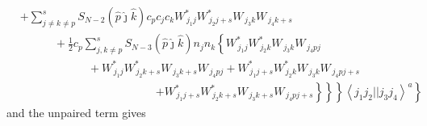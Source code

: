 \documentclass[aps,preprint]{revtex4}%
\begin{document}
\begin{align*}
&  +\sum_{j\neq k\neq p}^{s}S_{N-2}\left(  \hat{p}\hat{\jmath}\hat{k}\right)
c_{p}c_{j}c_{k}W_{\,j_{1}j}^{\ast}W_{\,j_{2}j+s}^{\ast}W_{\,j_{3}k}%
W_{\,j_{4}k+s}\qquad\qquad\qquad\\
&  \qquad\quad+\frac{1}{2}c_{p}\sum_{j,k\neq p}^{s}S_{N-3}\left(  \hat{p}%
\hat{\jmath}\hat{k}\right)  n_{j}n_{k}\left\{  W_{\,j_{1}j}^{\ast}W_{\,j_{2}%
k}^{\ast}W_{\,j_{3}k}W_{\,j_{4}pj}\right.  \\
&  \qquad\qquad\qquad+W_{\,j_{1}j}^{\ast}W_{\,j_{2}k+s}^{\ast}W_{\,j_{3}%
k+s}W_{\,j_{4}pj}+W_{\,j_{1}j+s}^{\ast}W_{\,j_{2}k}^{\ast}W_{\,j_{3}%
k}W_{\,j_{4}pj+s}\\
&  \qquad\qquad\qquad\qquad\qquad\qquad\left.  \left.  \left.  \left.
+W_{\,j_{1}j+s}^{\ast}W_{\,j_{2}k+s}^{\ast}W_{\,j_{3}k+s}W_{\,j_{4}%
pj+s}\right\}  \underset{}{\overset{}{}}\right\}  \right\}  \left\langle
j_{1}j_{2}||j_{3}j_{4}\right\rangle ^{a}\underset{}{\overset{\underset
{}{\overset{}{}}}{}}\right\}
\end{align*}
and the unpaired term gives
\end{document}
